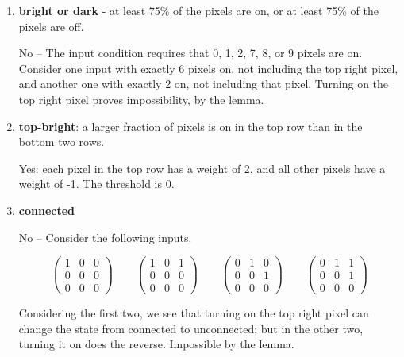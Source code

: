 \documentclass{article}
\newcommand{\mat}[1]{\begin{pmatrix}#1\end{pmatrix}}
\begin{document}
  \begin{enumerate}
  \item \textbf{bright or dark} - at least 75\% of the pixels are on,
    or at least 75\% of the pixels are off.

    No -- The input condition requires that 0, 1, 2, 7, 8, or 9 pixels
    are on. Consider one input with exactly 6 pixels on, not including
    the top right pixel, and another one with exactly 2 on, not
    including that pixel. Turning on the top right pixel proves
    impossibility, by the lemma.

  \item \textbf{top-bright}: a larger fraction of pixels is on in the
    top row than in the bottom two rows.

    Yes: each pixel in the top row has a weight of 2, and all other
    pixels have a weight of -1. The threshold is 0.


  \item \textbf{connected}

    No -- Consider the following inputs.

    \[\mat{1&0&0\\0&0&0\\0&0&0}\qquad\mat{1&0&1\\0&0&0\\0&0&0}\qquad\mat{0&1&0\\0&0&1\\0&0&0}\qquad\mat{0&1&1\\0&0&1\\0&0&0}\]

    Considering the first two, we see that turning on the top right
    pixel can change the state from connected to unconnected; but in
    the other two, turning it on does the reverse. Impossible by the
    lemma.

  \end{enumerate}
\end{document}
